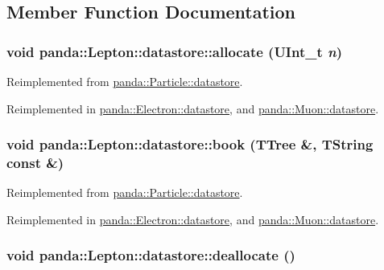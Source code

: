 \subsection{Member Function Documentation}
\hypertarget{structpanda_1_1Lepton_1_1datastore_a109ac02caed6e0a69a1b00248d80500e}{
\subsubsection[{allocate}]{\setlength{\rightskip}{0pt plus 5cm}void panda::Lepton::datastore::allocate (UInt\_\-t {\em n})}}
\label{structpanda_1_1Lepton_1_1datastore_a109ac02caed6e0a69a1b00248d80500e}


Reimplemented from \hyperlink{structpanda_1_1Particle_1_1datastore_aab4009a97b5f3cc30eaf61cd7dbf2e3d}{panda::Particle::datastore}.

Reimplemented in \hyperlink{structpanda_1_1Electron_1_1datastore_a3e84b684132c59a589f7a041cae61507}{panda::Electron::datastore}, and \hyperlink{structpanda_1_1Muon_1_1datastore_a6845ee992e7f6f23a4f159b97411bfc6}{panda::Muon::datastore}.\hypertarget{structpanda_1_1Lepton_1_1datastore_ab6cf5ada9f43228301c6bd97b9b6238a}{
\subsubsection[{book}]{\setlength{\rightskip}{0pt plus 5cm}void panda::Lepton::datastore::book (TTree \&, \/  TString const \&)}}
\label{structpanda_1_1Lepton_1_1datastore_ab6cf5ada9f43228301c6bd97b9b6238a}


Reimplemented from \hyperlink{structpanda_1_1Particle_1_1datastore_af75a5d8b8a18ee09ce98ab37888b4404}{panda::Particle::datastore}.

Reimplemented in \hyperlink{structpanda_1_1Electron_1_1datastore_aa22730e40dda69219e7dac203220dcae}{panda::Electron::datastore}, and \hyperlink{structpanda_1_1Muon_1_1datastore_ae3244041804870c1792c7ad3cd96ee53}{panda::Muon::datastore}.\hypertarget{structpanda_1_1Lepton_1_1datastore_a527515ee96020a4aaef41d9de157c131}{
\subsubsection[{deallocate}]{\setlength{\rightskip}{0pt plus 5cm}void panda::Lepton::datastore::deallocate ()}}
\label{structpanda_1_1Lepton_1_1datastore_a527515ee96020a4aaef41d9de157c131}


